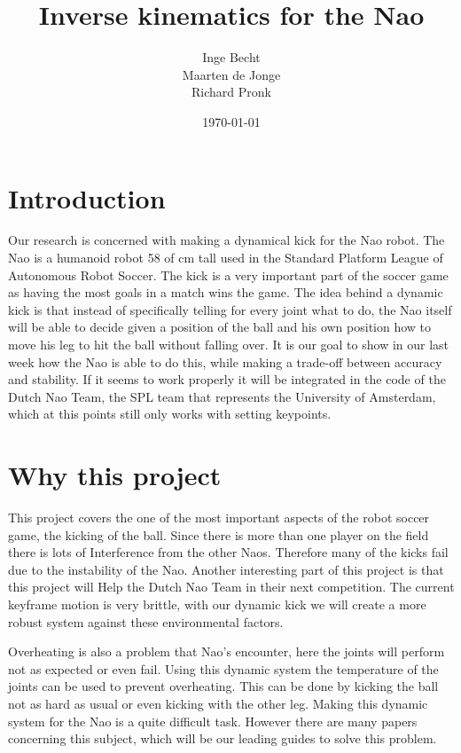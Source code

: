 \documentclass[a4paper]{article}
\begin{document}
\title{Inverse kinematics for the Nao}
\author{Inge Becht \\ Maarten de Jonge \\ Richard Pronk}
\date{\today}
\maketitle

\section{Introduction}
Our research is concerned with making a dynamical kick for the Nao robot. The Nao is a humanoid robot 58 of cm tall used in the Standard Platform League of Autonomous Robot Soccer. The kick is a very important part of the soccer game as having the most goals in a match wins the game. The idea behind a dynamic kick is that instead of specifically telling for every joint what to do, the Nao itself will be able to decide given a position of the ball and his own position how to move his leg to hit the ball without falling over. It is our goal to show in our last week how the Nao is able to do this, while making a trade-off between accuracy and stability. If it seems to work properly it will be integrated in the code of the Dutch Nao Team, the SPL team that represents the University of Amsterdam, which at this points still only works with setting keypoints.


\section{Why this project} 

This project covers the one of the most important aspects of the robot soccer game, the kicking of the ball. Since there is more than one player on the field there is lots of Interference from the other Naos. Therefore many of the kicks fail due to the instability of the Nao. Another interesting part of this project is that this project will Help the Dutch Nao Team in their next competition. The current keyframe motion is very brittle, with our dynamic kick we will create a more robust system against these environmental factors.

Overheating is also a problem that Nao’s encounter, here the joints will perform not as expected or even fail. Using this dynamic system the temperature of the joints can be used to prevent overheating. This can be done by kicking the ball not as hard as usual or even kicking with the other leg. Making this dynamic system for the Nao is a quite difficult task. However there are many papers concerning this subject, which will be our leading guides to solve this problem. 
\end{document}
